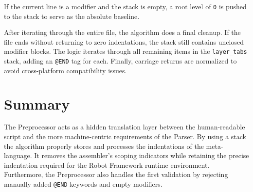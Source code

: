If the current line is a modifier and the stack is empty, a root level of \texttt{0} is pushed to the stack to serve as the absolute baseline.

After iterating through the entire file, the algorithm does a final cleanup. If the file ends without returning to zero indentations, the stack still contains unclosed modifier blocks. The logic iterates through all remaining items in the \texttt{layer\_tabs} stack, adding an \texttt{@END} tag for each. Finally, carriage returns are normalized to avoid cross-platform compatibility issues.


\section{Summary}


The Preprocessor acts as a hidden translation layer between the human-readable script and the more machine-centric requirements of the Parser. By using a stack the algorithm properly stores and processes the indentations of the meta-language. It removes the assembler's scoping indicators while retaining the precise indentation required for the Robot Framework runtime environment. Furthermore, the Preprocessor also handles the first validation by rejecting manually added \texttt{@END} keywords and empty modifiers.